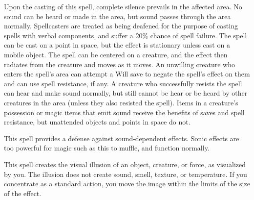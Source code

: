 \spellrng{\rngmed}
\begin{spelleffect}
  Upon the casting of this spell, complete silence prevails in the affected area. No sound can be heard or made in the area, but sound passes through the area normally. Spellcasters are treated as being deafened for the purpose of casting spells with verbal components, and suffer a 20\% chance of spell failure. The spell can be cast on a point in space, but the effect is stationary unless cast on a mobile object. The spell can be centered on a creature, and the effect then radiates from the creature and moves as it moves. An unwilling creature who enters the spell's area can attempt a Will save to negate the spell's effect on them and can use spell resistance, if any. A creature who successfully resists the spell can hear and make sound normally, but still cannot be hear or be heard by other creatures in the area (unless they also resisted the spell). Items in a creature's possession or magic items that emit sound receive the benefits of saves and spell resistance, but unattended objects and points in space do not. 
\end{spelleffect}
\begin{spellnotes}
  This spell provides a defense against sound-dependent effects. Sonic effects are too powerful for magic such as this to muffle, and function normally.
\end{spellnotes}

\spellrng{\rngmed}
\spelldur{\durshort}
\begin{spelleffect}
  This spell creates the visual illusion of an object, creature, or force, as visualized by you. The illusion does not create sound, smell, texture, or temperature. If you concentrate as a standard action, you move the image within the limits of the size of the effect.
\end{spelleffect}

